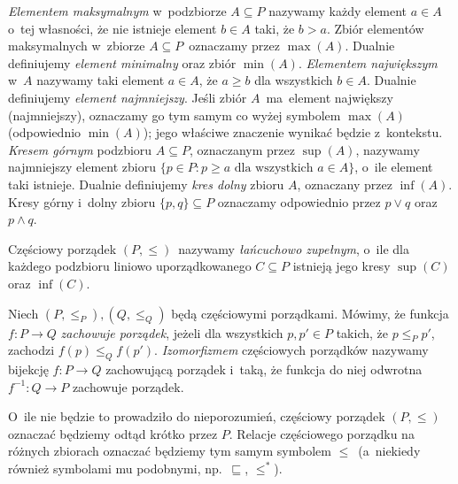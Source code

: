 \textit{Elementem maksymalnym} w~podzbiorze $A\subseteq P$ nazywamy każdy element $a\in A$ o~tej własności, że nie istnieje element $b\in A$ taki, że $b>a$. Zbiór elementów maksymalnych w~zbiorze $A\subseteq P$~oznaczamy przez $\max(A)$. Dualnie definiujemy \textit{element minimalny} oraz zbiór $\min(A)$. \textit{Elementem największym} w~$A$ nazywamy taki element $a\in A$, że $a\geq b$ dla wszystkich $b\in A$. Dualnie definiujemy \textit{element najmniejszy}. Jeśli zbiór $A$~ma~element największy (najmniejszy), oznaczamy go tym samym co wyżej symbolem $\max(A)$ (odpowiednio $\min(A)$); jego właściwe znaczenie wynikać będzie z~kontekstu. \textit{Kresem górnym} podzbioru $A\subseteq P$, oznaczanym przez $\sup(A)$, nazywamy najmniejszy element zbioru $\{p\in P:p\geq a \text{ dla wszystkich } a\in A\}$, o~ile element taki istnieje. Dualnie definiujemy \textit{kres dolny} zbioru $A$, oznaczany przez $\inf(A)$. Kresy górny i~dolny zbioru $\{p,q\}\subseteq P$ oznaczamy odpowiednio przez $p\lor q$ oraz~$p\land q$. 

Częściowy porządek $(P,\leq)$~nazywamy \textit{łańcuchowo zupełnym}, o~ile dla każdego podzbioru liniowo uporządkowanego $C\subseteq P$ istnieją jego kresy $\sup(C)$ oraz $\inf(C)$.

Niech $(P,\leq_P),(Q,\leq_Q)$ będą częściowymi porządkami. Mówimy, że funkcja $f\colon P\to Q$ \textit{zachowuje porządek}, jeżeli dla wszystkich $p,p'\in P$ takich, że \mbox{$p\leq_P p'$}, zachodzi $f(p)\leq_Q f(p')$. \textit{Izomorfizmem} częściowych porządków nazywamy bijekcję $f\colon P\to Q$ zachowującą porządek i~taką, że funkcja do niej odwrotna $f^{-1}\colon Q\to P$ zachowuje porządek.

O~ile nie będzie to prowadziło do nieporozumień, częściowy porządek $(P,\leq)$ oznaczać będziemy odtąd krótko przez $P$. Relacje częściowego porządku na różnych zbiorach oznaczać będziemy tym samym symbolem $\leq$~(a~niekiedy również symbolami mu podobnymi, np.~$\sqsubseteq$, $\leq^*$).


